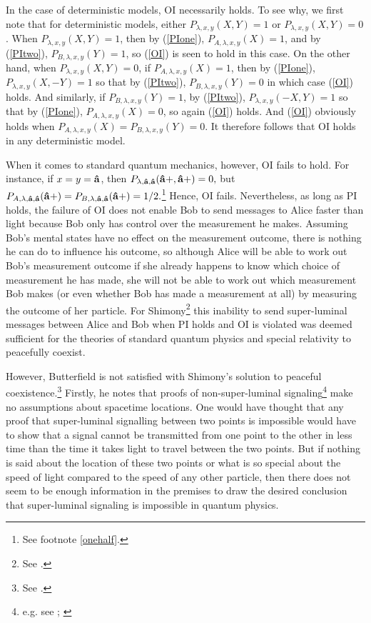 \label{OIdet}In the case of deterministic models, OI necessarily holds. To see why, we first note that for deterministic models, either $P_{\lambda,x,y}(X,Y)=1$ or $P_{\lambda,x,y}(X,Y)=0$. When $P_{\lambda,x,y}(X,Y)=1$, then by (\ref{PIone}), $P_{A, \lambda,x,y}(X)=1$, and by (\ref{PItwo}), $P_{B, \lambda,x,y}(Y)=1$, so (\ref{OI}) is seen to hold in this case. On the other hand, when $P_{\lambda,x,y}(X,Y)=0$,  if $P_{A, \lambda,x,y}(X)=1$, then by (\ref{PIone}), $P_{\lambda,x,y} (X,-Y)=1$ so that by (\ref{PItwo}), $P_{B, \lambda,x,y}(Y)=0$ in which case (\ref{OI}) holds. And similarly, if $P_{B, \lambda,x,y}(Y)=1$, by (\ref{PItwo}), $P_{\lambda,x,y} (-X,Y)=1$ so that by (\ref{PIone}), $P_{A, \lambda,x,y}(X)=0$, so again (\ref{OI}) holds. And (\ref{OI}) obviously holds when $P_{A, \lambda,x,y}(X)=P_{B, \lambda,x,y}(Y)=0$. It therefore follows that OI holds in any deterministic model.

When it comes to standard quantum mechanics, however, OI fails to hold. For instance, if $x=y=\vb{\hat{a}}$, then $P_{\lambda,\vb{\hat{a}},\vb{\hat{a}}}(\vb{\hat{a}+},\vb{\hat{a}+})=0,$ but $P_{A, \lambda,\vb{\hat{a}},\vb{\hat{a}}}(\vb{\hat{a}+})=P_{B, \lambda,\vb{\hat{a}},\vb{\hat{a}}}(\vb{\hat{a}+})=1/2.$\footnote{See footnote \ref{onehalf}. } Hence, OI fails. Nevertheless, as long as PI holds, the failure of OI does not enable Bob to send messages to Alice faster than light because Bob only has control over the measurement he makes. Assuming Bob's mental states have no effect on the measurement outcome, there is nothing he can do to influence his outcome, so although Alice will be able to work out Bob's measurement outcome if she already happens to know which choice of measurement he has made, she will not be able to work out which measurement Bob makes (or even whether Bob has made a measurement at all) by measuring the outcome of her particle. For Shimony\footnote{See \cite[146-147]{Shimony86}.} this inability to send super-luminal messages between Alice and Bob when PI holds and OI is violated was deemed sufficient for the theories of standard quantum physics and special relativity to peacefully coexist. 

However, Butterfield is not satisfied with Shimony's solution to peaceful coexistence.\footnote{See \cite[p. 12]{Butterfield}.} Firstly, he notes that proofs of non-super-luminal signaling\footnote{e.g. see \cite[p. 113--116]{Redhead}; \cite[p. 139--140]{Hiley}} make no assumptions about spacetime locations. One would have thought that any proof that super-luminal signalling between two points is impossible would have to show that a signal cannot be transmitted from one point to the other in less time than the time it takes light to travel between the two points. But if nothing is said about the location of these two points or what is so special about the speed of light compared to the speed of any other particle, then there does not seem to be enough information in the premises to draw the desired conclusion that super-luminal signaling is impossible in quantum physics.

